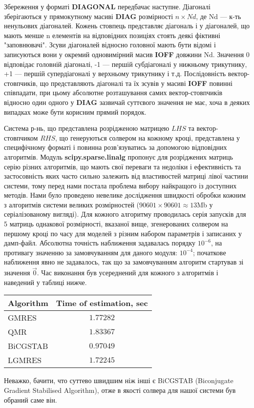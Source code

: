 Збереження у форматі \textbf{DIAGONAL} передбачає наступне. Діагоналі зберігаються у прямокутному масиві \textbf{DIAG} розмірності $n\times Nd$, де Nd --- к-ть ненульових діагоналей. Кожень стовпець представляє діагональ і у діагоналей, що мають менше n елементів на відповідних позиціях стоять деякі фіктивні "заповнювачі". Зсуви діагоналей відносно головної мають бути відомі і записуються вони у окремий одновимірний масив \textbf{IOFF} довжини Nd. Значення 0 відповідає головній діагоналі, -1 --- першій субдіагоналі у нижньому трикутнику, +1 --- першій супердіагоналі у верхньому трикутнику і т.д. Послідовність вектор-стовпчиків, що представляють діагоналі та їх зсувів у масиві \textbf{IOFF} повинні співпадати, при цьому абсолютне розташування самих вектор-стовпчиків відносно один одного у \textbf{DIAG} зазвичай суттєвого значення не має, хоча в деяких випадках може бути корисним прямий порядок.

Система р-нь, що представлена розрідженою матрицею $LHS$ та вектор-стовпчиком $RHS$, що генеруються солвером на кожному кроці, представлена у специфічному форматі і повинна розв’язуватись за допомогою відповідних алгоритмів. Модуль \textbf{scipy.sparse.linalg} пропонує для розріджених матриць серію різних алгоритмів, що мають свої переваги та недоліки і ефективність та застосовність яких часто сильно залежить від властивостей матриці лівої частини системи, тому перед нами постала проблема вибору найкращого із доступних методів. Нами було проведено невелике дослідження швидкості обробки кожним з алгоритмів системи великих розмірностей ($90601\times90601 \approx 13$Mb у серіалізованому вигляді). Для кожного алгоритму проводилась серія запусків для 5 матриць однакової розмірності, вказаної вище, згенерованих солвером на першому кроці по часу для моделей з різним набором параметрів і записаних у дамп-файл. Абсолютна точність наближення задавалась порядку $10^{-6}$, на противагу значенню за замовчуванням для даного модуля: $10^{-4}$; початкове наближення явно не задавалось, так що за замовчуванням алгоритм стартував зі значення $\vec{0}$. Час виконання був усереднений для кожного з алгоритмів і наведений у таблиці нижче.
\vspace{10pt}
\begin{center}
	\begin{tabular}{|l|c|}
	\hline
	Algorithm & Time of estimation, sec \\ \hline
	GMRES & $1.77282$ \\ \hline
	QMR & $1.83367$ \\ \hline
	BiCGSTAB & $0.97049$\\ \hline
	LGMRES & $1.72245$\\ \hline
	\end{tabular}
\end{center}
\vspace{10pt}
Неважко, бачити, что суттево швидшим ніж інші є BiCGSTAB (Biconjugate Gradient Stabilised Algorithm), отже в якості солвера для нашої системи був обраний саме він.

